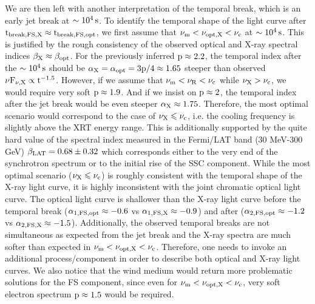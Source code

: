 \documentclass{naturesubmissionstyle}
\begin{document}
We are then left with another interpretation of the temporal break, which is an early jet break\cite{Rhoads1997,Sari1999b} at $\rm \sim 10^{4} \, s$. To identify the temporal shape of the light curve after $\rm t_{break,FS,X} \approx t_{break,FS,opt}$, we first assume that $\rm \nu_{m}<\nu_{opt,X}<\nu_{c}$
at $\rm \sim 10^{4} \, s$. This is justified by the rough consistency of the observed optical and X-ray spectral indices $\rm \beta_{X} \approx \beta_{opt}$. For the previously inferred $\rm p \approx 2.2$, the temporal index after the $\rm \sim 10^{4} \, s$ should be $\rm \alpha_{X}=\alpha_{opt}=3p/4 \approx 1.65$ steeper than observed $\rm \nu F_{\nu,X} \propto t^{-1.5}$. However, if we assume that $\rm \nu_{m}<\nu_{R}<\nu_{c}$ while $\rm \nu_{X}>\nu_{c}$, we would require very soft $\rm p \approx 1.9$. And if we insist on $\rm p \approx 2$, the temporal index after the jet break would be even steeper $\rm \alpha_{X} \approx 1.75$. Therefore, the most optimal scenario would correspond to the case of $\rm \nu_{X} \leqslant \nu_{c}$, i.e. the cooling frequency is slightly above the XRT energy range. This is additionally supported by the quite hard value of the spectral index measured in the Fermi/LAT band (30 MeV-300 GeV) $\rm \beta_{LAT} = 0.68 \pm 0.32$ which corresponds either to the very end of the synchrotron spectrum or to the initial rise of the SSC component. While the most optimal scenario ($\rm \nu_{X} \leqslant \nu_{c}$) is roughly consistent 
with the temporal shape of the X-ray light curve, it is highly inconsistent with the joint chromatic optical light curve. The optical light curve is shallower than the X-ray light curve before the temporal break ($\rm \alpha_{1,FS,opt} \approx -0.6$ vs $\rm \alpha_{1,FS,X} \approx -0.9$) and after ($\rm \alpha_{2,FS,opt} \approx -1.2$ vs $\rm \alpha_{2,FS,X} \approx -1.5$). Additionally, the observed temporal breaks are not simultaneous as expected from the jet break and the X-ray spectra are much softer than expected in $\rm \nu_{m}<\nu_{opt,X}<\nu_{c}$. Therefore, one needs to invoke an additional process/component in order to describe both optical and X-ray light curves. We also notice that the wind medium would return more problematic solutions for the FS component, since even for $\rm \nu_{m}<\nu_{opt,X}<\nu_{c}$, very soft electron spectrum $\rm p \approx 1.5$ would be required. 
\end{document}
